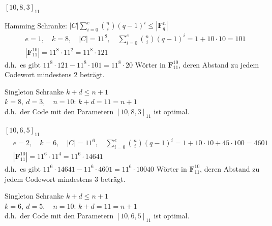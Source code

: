 \begin{loesung}
$[10, 8, 3]_{11}$

Hamming Schranke: \quad $|C| \displaystyle\sum_{i=0}^{e} \binom{n}{i} (q-1)^i \le |\mathbf{F}_q^n|$
\begin{align*}
& e = 1,\quad k = 8,\quad |C| = 11^8,\quad \sum_{i=0}^{e} \binom{n}{i} (q-1)^i = 1 + 10\cdot 10 = 101\\
& |\mathbf{F}_{11}^{10}| = 11^8\cdot 11^2 = 11^8\cdot 121
\end{align*}
d.h.\ es gibt $11^8\cdot 121 - 11^8\cdot 101 = 11^8\cdot 20$ Wörter in $\mathbf{F}_{11}^{10}$, deren Abstand zu jedem Codewort mindestens 2 beträgt.

Singleton Schranke \quad $k + d \le n + 1$\\
$k = 8,\ d = 3,\quad n = 10$: \quad $k + d = 11 = n + 1$\\
d.h.\ der Code mit den Parametern $[10, 8, 3]_{11}$ ist optimal.

$[10, 6, 5]_{11}$
\begin{align*}
& e = 2,\quad k = 6,\quad |C| = 11^6,\quad \sum_{i=0}^{e} \binom{n}{i} (q-1)^i = 1 + 10\cdot 10 + 45\cdot 100 = 4601\\
& |\mathbf{F}_{11}^{10}| = 11^6\cdot 11^4 = 11^6\cdot 14641
\end{align*}
d.h.\ es gibt $11^6\cdot 14641 - 11^6\cdot 4601 = 11^6\cdot 10040$ Wörter in $\mathbf{F}_{11}^{10}$, deren Abstand zu jedem Codewort mindestens 3 beträgt.

Singleton Schranke \quad $k + d \le n + 1$\\
$k = 6,\ d = 5,\quad n = 10$: \quad $k + d = 11 = n + 1$\\
d.h.\ der Code mit den Parametern $[10, 6, 5]_{11}$ ist optimal.
\end{loesung}
